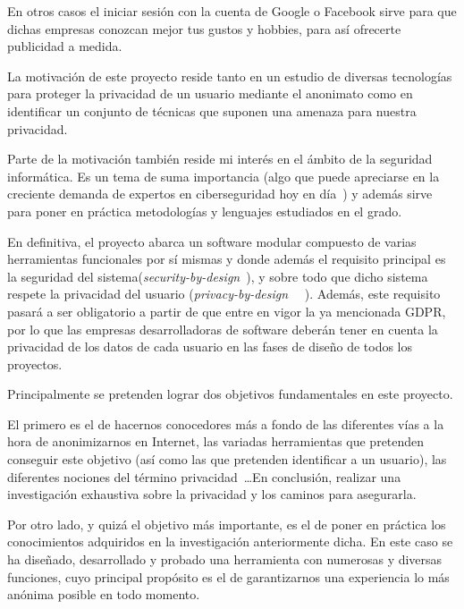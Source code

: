 En otros casos el iniciar sesión con la cuenta de Google o Facebook sirve para que dichas empresas conozcan mejor tus gustos y hobbies, para así ofrecerte publicidad a medida. 

La motivación de este proyecto reside tanto en un estudio de diversas tecnologías para proteger la privacidad de un usuario mediante el anonimato como en identificar un conjunto de técnicas que suponen una amenaza para nuestra privacidad.
 
Parte de la motivación también reside mi interés en el ámbito de la seguridad informática. Es un tema de suma importancia (algo que puede apreciarse en la creciente demanda de expertos en ciberseguridad hoy en día~\cite{article:expCiberseguridad}) y además sirve para poner en práctica metodologías y lenguajes estudiados en el grado. 

En definitiva, el proyecto  abarca un software modular compuesto de varias herramientas funcionales por sí mismas y donde además el requisito principal es la seguridad del sistema(\textit{security-by-design}~\cite{paper:secbydesign}), y sobre todo que dicho sistema respete la privacidad del usuario (\textit{privacy-by-design}~\cite{paper:privacybydesign} ~\cite{cavoukian2009privacy}). Además, este requisito pasará a ser obligatorio a partir de que entre en vigor la ya mencionada GDPR, por lo que las empresas desarrolladoras de software deberán tener en cuenta la privacidad de los datos de cada usuario en las fases de diseño de todos los proyectos.



Principalmente se pretenden lograr dos objetivos fundamentales en este proyecto.

El primero es el de hacernos conocedores más a fondo de las diferentes vías a la hora de anonimizarnos en Internet, las variadas herramientas que pretenden conseguir este objetivo (así como las que pretenden identificar a un usuario), las diferentes nociones del término privacidad~\cite{article:danezis2010}\dots En conclusión, realizar una investigación exhaustiva sobre la privacidad y los caminos para asegurarla.

Por otro lado, y quizá el objetivo más importante, es el de poner en práctica los conocimientos adquiridos en la investigación anteriormente dicha. En este caso se ha diseñado, desarrollado y probado una herramienta con numerosas y diversas funciones, cuyo principal propósito es el de garantizarnos una experiencia lo más anónima posible en todo momento.



